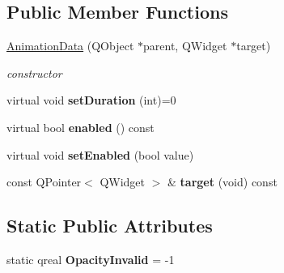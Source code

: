 \subsection*{Public Member Functions}
\begin{DoxyCompactItemize}
\item 
\mbox{\label{class_animation_data_a888d6bbf297e20eaf87b61b9a128838d}} 
\hyperlink{class_animation_data_a888d6bbf297e20eaf87b61b9a128838d}{Animation\+Data} (Q\+Object $\ast$parent, Q\+Widget $\ast$target)
\begin{DoxyCompactList}\small\item\em constructor \end{DoxyCompactList}\item 
\mbox{\label{class_animation_data_a7da35d69e3d4469479aee72a4aa9a700}} 
virtual void {\bfseries set\+Duration} (int)=0
\item 
\mbox{\label{class_animation_data_aa02f9de64c0fe56eb5af6a2ff7b969a9}} 
virtual bool {\bfseries enabled} () const
\item 
\mbox{\label{class_animation_data_a3cc47ca4c0a7a8fb51f37a5a49a4c41e}} 
virtual void {\bfseries set\+Enabled} (bool value)
\item 
\mbox{\label{class_animation_data_ac8179c3caac9b87ad9a9ff2126a1e764}} 
const Q\+Pointer$<$ Q\+Widget $>$ \& {\bfseries target} (void) const
\end{DoxyCompactItemize}
\subsection*{Static Public Attributes}
\begin{DoxyCompactItemize}
\item 
\mbox{\label{class_animation_data_a81a1820f7d0ef17f391a4b1996052563}} 
static qreal {\bfseries Opacity\+Invalid} = -\/1
\end{DoxyCompactItemize}

